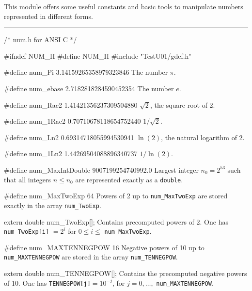 
This module offers some useful constants and basic tools to
manipulate numbers represented in different forms.

\bigskip\hrule
\code\hide
/* num.h for ANSI C */

#ifndef NUM_H
#define NUM_H
\endhide
#include "TestU01/gdef.h"
\endcode

\code

#define num_Pi     3.14159265358979323846
\endcode
  \tab The number $\pi$.
  \endtab
\code

#define num_ebase  2.7182818284590452354
\endcode
  \tab The number $e$.
  \endtab
\code

#define num_Rac2   1.41421356237309504880
\endcode
  \tab $\sqrt{2}$, the square root of 2.
  \endtab
\code

#define num_1Rac2  0.70710678118654752440
\endcode
  \tab $1/\sqrt{2}$.
  \endtab
\code

#define num_Ln2    0.69314718055994530941
\endcode
  \tab $\ln(2)$, the natural logarithm of 2.
  \endtab
\code

#define num_1Ln2   1.44269504088896340737
\endcode
  \tab $1 / \ln(2)$.
  \endtab
\code

#define num_MaxIntDouble   9007199254740992.0
\endcode
  \tab Largest integer $n_0 = 2^{53}$ such that all integers
  $n \le n_0$ are represented  exactly as a {\tt double}.
  \endtab


\code

#define num_MaxTwoExp   64
\endcode
  \tab Powers of 2 up to {\tt num\_MaxTwoExp} are stored exactly
  in the array {\tt num\_TwoExp}.
  \endtab
\code

extern double num_TwoExp[];
\endcode
  \tab  Contains precomputed powers of 2.
  One has {\tt num\_TwoExp[i]} $= 2^i$ for $0 \le i \le$
  {\tt num\_MaxTwoExp}.
\endtab
\code

#define num_MAXTENNEGPOW   16
\endcode
  \tab Negative powers of 10 up to {\tt num\_MAXTENNEGPOW} are stored
  in the array {\tt num\_TENNEGPOW}.
  \endtab
\code

extern double num_TENNEGPOW[];
\endcode
 \tab Contains the precomputed negative powers of 10.
   One has {\tt TENNEGPOW[j]}$ = 10^{-j}$, for $j=0,\ldots,$
 {\tt num\_MAXTENNEGPOW}.
\endtab


\code


